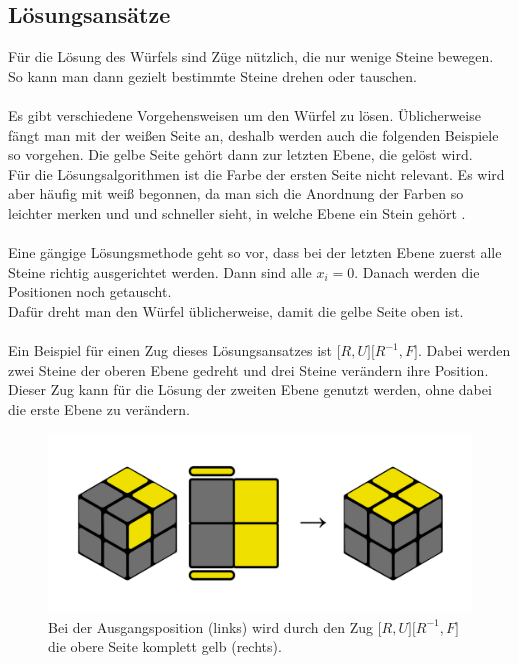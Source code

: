 \documentclass[12pt,a4paper, usenames, dvipsnames]{article}
\begin{document}
\subsection*{Lösungsansätze}
Für die Lösung des Würfels sind Züge nützlich, die nur wenige Steine bewegen. So kann man dann gezielt bestimmte Steine drehen oder tauschen. \\
\\
Es gibt verschiedene Vorgehensweisen um den Würfel zu lösen. Üblicherweise fängt man mit der weißen Seite an, deshalb werden auch die folgenden Beispiele so vorgehen. Die gelbe Seite gehört dann zur letzten Ebene, die gelöst wird. \\
Für die Lösungsalgorithmen ist die Farbe der ersten Seite nicht relevant. Es wird aber häufig mit weiß begonnen, da man sich die Anordnung der Farben so leichter merken und und schneller sieht, in welche Ebene ein Stein gehört \cite{RF}. \\
\\
Eine gängige Lösungsmethode geht so vor, dass bei der letzten Ebene zuerst alle Steine richtig ausgerichtet werden. Dann sind alle $x_i=0$. Danach werden die Positionen noch getauscht. \\
Dafür dreht man den Würfel üblicherweise, damit die gelbe Seite oben ist. \\
\\
Ein Beispiel für einen Zug dieses Lösungsansatzes ist $\lbrack R, U \rbrack \lbrack R^{-1}, F \rbrack$. Dabei werden zwei Steine der oberen Ebene gedreht und drei Steine verändern ihre Position. Dieser Zug kann für die Lösung der zweiten Ebene genutzt werden, ohne dabei die erste Ebene zu verändern. \cite{RF2} 

\begin{figure}[H]
\centering
\includegraphics[scale=0.12]{isiakanm.png}
\caption[Würfelposition für Zug $\lbrack R, U \rbrack \lbrack R^{-1}, F \rbrack$ (links) und danach (rechts)]{Bei der Ausgangsposition (links) wird durch den Zug $\lbrack R, U \rbrack \lbrack R^{-1}, F \rbrack$ die obere Seite komplett gelb (rechts).}

\end{figure}
\end{document}
